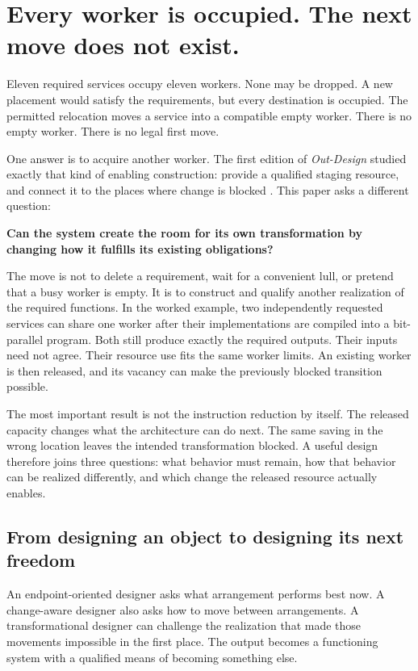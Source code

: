 \documentclass[11pt,letterpaper]{article}
\theoremstyle{definition}\newtheorem{definition}[theorem]{Definition}
\theoremstyle{remark}\newtheorem{remark}[theorem]{Remark}
\begin{document}
\section{Every worker is occupied. The next move does not exist.}
Eleven required services occupy eleven workers. None may be dropped. A new placement would satisfy the requirements, but every destination is occupied. The permitted relocation moves a service into a compatible empty worker. There is no empty worker. There is no legal first move.

One answer is to acquire another worker. The first edition of \emph{Out-Design} studied exactly that kind of enabling construction: provide a qualified staging resource, and connect it to the places where change is blocked \citep{design1}. This paper asks a different question:

\begin{thesis}
\textbf{Can the system create the room for its own transformation by changing how it fulfills its existing obligations?}
\end{thesis}

The move is not to delete a requirement, wait for a convenient lull, or pretend that a busy worker is empty. It is to construct and qualify another realization of the required functions. In the worked example, two independently requested services can share one worker after their implementations are compiled into a bit-parallel program. Both still produce exactly the required outputs. Their inputs need not agree. Their resource use fits the same worker limits. An existing worker is then released, and its vacancy can make the previously blocked transition possible.

The most important result is not the instruction reduction by itself. The released capacity changes what the architecture can do next. The same saving in the wrong location leaves the intended transformation blocked. A useful design therefore joins three questions: what behavior must remain, how that behavior can be realized differently, and which change the released resource actually enables.

\subsection{From designing an object to designing its next freedom}
An endpoint-oriented designer asks what arrangement performs best now. A change-aware designer also asks how to move between arrangements. A transformational designer can challenge the realization that made those movements impossible in the first place. The output becomes a functioning system with a qualified means of becoming something else.
\end{document}
